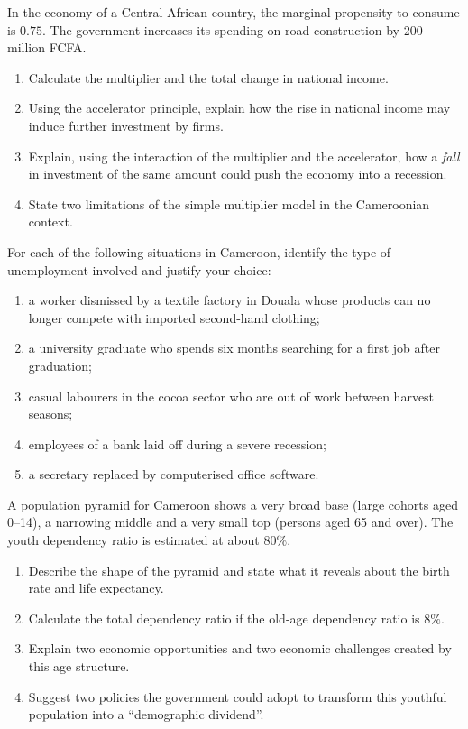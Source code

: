 \documentclass[11pt]{article}
\begin{document}
\begin{exercice}
In the economy of a Central African country, the marginal propensity to consume is $0.75$. The government increases its spending on road construction by $200$ million FCFA.
\begin{enumerate}
\item Calculate the multiplier and the total change in national income.
\item Using the accelerator principle, explain how the rise in national income may induce further investment by firms.
\item Explain, using the interaction of the multiplier and the accelerator, how a \emph{fall} in investment of the same amount could push the economy into a recession.
\item State two limitations of the simple multiplier model in the Cameroonian context.
\end{enumerate}
\end{exercice}

\begin{exercice}
For each of the following situations in Cameroon, identify the type of unemployment involved and justify your choice:
\begin{enumerate}
\item a worker dismissed by a textile factory in Douala whose products can no longer compete with imported second-hand clothing;
\item a university graduate who spends six months searching for a first job after graduation;
\item casual labourers in the cocoa sector who are out of work between harvest seasons;
\item employees of a bank laid off during a severe recession;
\item a secretary replaced by computerised office software.
\end{enumerate}
\end{exercice}

\begin{exercice}
A population pyramid for Cameroon shows a very broad base (large cohorts aged 0--14), a narrowing middle and a very small top (persons aged 65 and over). The youth dependency ratio is estimated at about $80\%$.
\begin{enumerate}
\item Describe the shape of the pyramid and state what it reveals about the birth rate and life expectancy.
\item Calculate the total dependency ratio if the old-age dependency ratio is $8\%$.
\item Explain two economic opportunities and two economic challenges created by this age structure.
\item Suggest two policies the government could adopt to transform this youthful population into a ``demographic dividend''.
\end{enumerate}
\end{exercice}
\end{document}
